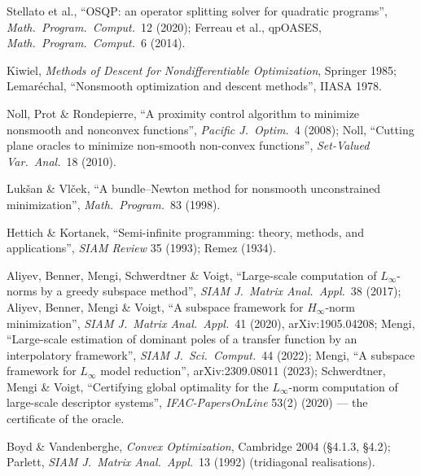 \documentclass[11pt,a4paper]{article}
\newcommand{\revf}[1]{{\color{revf}#1}}
\begin{document}
{\begin{itemize}[leftmargin=1.2em,itemsep=0pt]
\item Stellato et al., ``OSQP: an operator splitting solver for quadratic programs'', \emph{Math.\ Program.\ Comput.}\ 12 (2020); Ferreau et al., qpOASES, \emph{Math.\ Program.\ Comput.}\ 6 (2014).
\item Kiwiel, \emph{Methods of Descent for Nondifferentiable Optimization}, Springer 1985; Lemar\'echal, ``Nonsmooth optimization and descent methods'', IIASA 1978.
\item Noll, Prot \& Rondepierre, ``A proximity control algorithm to minimize nonsmooth and nonconvex functions'', \emph{Pacific J.\ Optim.}\ 4 (2008); Noll, ``Cutting plane oracles to minimize non-smooth non-convex functions'', \emph{Set-Valued Var.\ Anal.}\ 18 (2010).
\item Luk\v san \& Vl\v cek, ``A bundle--Newton method for nonsmooth unconstrained minimization'', \emph{Math.\ Program.}\ 83 (1998).
\item Hettich \& Kortanek, ``Semi-infinite programming: theory, methods, and applications'', \emph{SIAM Review} 35 (1993); Remez (1934).
\revf{\item Aliyev, Benner, Mengi, Schwerdtner \& Voigt, ``Large-scale computation of $L_\infty$-norms by a greedy subspace method'', \emph{SIAM J.\ Matrix Anal.\ Appl.}\ 38 (2017); Aliyev, Benner, Mengi \& Voigt, ``A subspace framework for $H_\infty$-norm minimization'', \emph{SIAM J.\ Matrix Anal.\ Appl.}\ 41 (2020), arXiv:1905.04208; Mengi, ``Large-scale estimation of dominant poles of a transfer function by an interpolatory framework'', \emph{SIAM J.\ Sci.\ Comput.}\ 44 (2022); Mengi, ``A subspace framework for $L_\infty$ model reduction'', arXiv:2309.08011 (2023); Schwerdtner, Mengi \& Voigt, ``Certifying global optimality for the $L_\infty$-norm computation of large-scale descriptor systems'', \emph{IFAC-PapersOnLine} 53(2) (2020) --- the certificate of the oracle.}
\item Boyd \& Vandenberghe, \emph{Convex Optimization}, Cambridge 2004 (\S4.1.3, \S4.2); Parlett, \emph{SIAM J.\ Matrix Anal.\ Appl.}\ 13 (1992) (tridiagonal realisations).
\end{itemize}}
\end{document}
